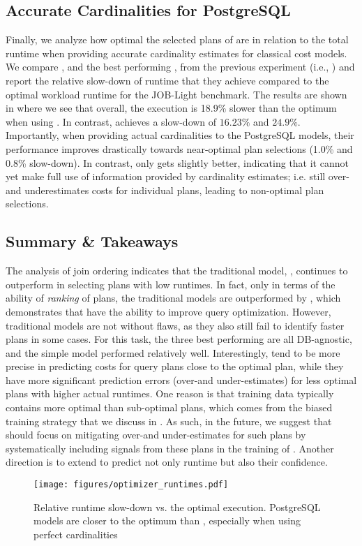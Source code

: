 \subsection{Accurate Cardinalities for PostgreSQL}\label{subsec:optimizer_comparison}
Finally, we analyze how optimal the selected plans of \lcms are in relation to the total runtime when providing accurate cardinality estimates for classical cost models. 
We compare \postgresx, \postgresxvi and the best performing \lcm, from the previous experiment (i.e., \zeroshot) and report the relative slow-down of runtime that they achieve compared to the optimal workload runtime for the JOB-Light benchmark.
The results are shown in  where we see that overall, the execution is 18.9\% slower than the optimum when using \zeroshot.
In contrast, \postgresx achieves a slow-down of $16.23\%$ and \postgresxvi $24.9\%$. 
Importantly, when providing actual cardinalities to the PostgreSQL models, their performance improves drastically towards near-optimal plan selections (1.0\% and 0.8\% slow-down).
In contrast, \zeroshot only gets slightly better, indicating that it cannot yet make full use of information provided by cardinality estimates; i.e. \zeroshot still over- and underestimates costs for individual plans, leading to non-optimal plan selections.

\subsection{Summary \& Takeaways}
The analysis of join ordering indicates that the traditional model, \postgres, continues to outperform \lcms in selecting plans with low runtimes. 
In fact, only in terms of the ability of \textit{ranking} of plans, the traditional models are outperformed by \zeroshot, which demonstrates that \lcms have the ability to improve query optimization.
However, traditional models are not without flaws, as they also still fail to identify faster plans in some cases.
For this task, the three best performing \lcms are all DB-agnostic, and the simple model \flatvector performed relatively well.
Interestingly, \lcms tend to be more precise in predicting costs for query plans close to the optimal plan, while they have more significant prediction errors (over-and under-estimates) for less optimal plans with higher actual runtimes. 
One reason is that training data typically contains more optimal than sub-optimal plans, which comes from the biased training strategy that we discuss in .
As such, in the future, we suggest that \lcms should focus on mitigating over-and under-estimates for such plans by systematically including signals from these plans in the training of \lcms.
Another direction is to extend \lcms to predict not only runtime but also their confidence.

\begin{figure}
    \centering
    \texttt{[image: figures/optimizer\_runtimes.pdf]}
    \caption{Relative runtime slow-down vs. the optimal execution. PostgreSQL models are closer to the optimum than \lcms, especially when using perfect cardinalities}
    \label{fig:optimizer_runtime}
\end{figure}